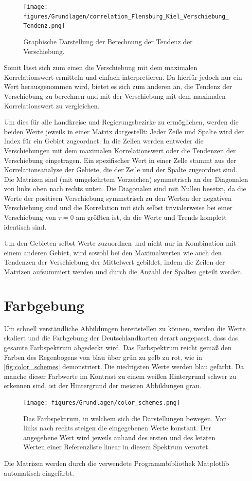 \begin{figure}[H]
    \centering
    \texttt{[image: figures/Grundlagen/correlation\_Flensburg\_Kiel\_Verschiebung\_Tendenz.png]}
    \caption{Graphische Darstellung der Berechnung der Tendenz der Verschiebung.}
    \label{fig:Flensburg_Kiel_Verschiebung_Tendenz}
\end{figure}

Somit lässt sich zum einen die Verschiebung mit dem maximalen Korrelationswert ermitteln und einfach interpretieren.
Da hierfür jedoch nur ein Wert herausgenommen wird, bietet es sich zum anderen an, die Tendenz der Verschiebung zu berechnen und mit der Verschiebung mit dem maximalen Korrelationswert zu vergleichen.



Um dies für alle Landkreise und Regierungsbezirke zu ermöglichen, werden die beiden Werte jeweils in einer Matrix dargestellt: Jeder Zeile und Spalte wird der Index für ein Gebiet zugeordnet. In die Zellen werden entweder die Verschiebungen mit dem maximalen Korrelationswert oder die Tendenzen der Verschiebung eingetragen. Ein spezifischer Wert in einer Zelle stammt aus der Korrelationsanalyse der Gebiete, die der Zeile und der Spalte zugeordnet sind.
Die Matrizen sind (mit umgekehrtem Vorzeichen) symmetrisch an der Diagonalen von links oben nach rechts unten. Die Diagonalen sind mit Nullen besetzt, da die Werte der positiven Verschiebung symmetrisch zu den Werten der negativen Verschiebung sind und die Korrelation mit sich selbst trivialerweise bei einer Verschiebung von $\tau=0$ am größten ist, da die Werte und Trends komplett identisch sind.

Um den Gebieten selbst Werte zuzuordnen und nicht nur in Kombination mit einem anderen Gebiet, wird sowohl bei den Maximalwerten wie auch den Tendenzen der Verschiebung der Mittelwert gebildet, indem die Zeilen der Matrizen aufsummiert werden und durch die Anzahl der Spalten geteilt werden.
\section{Farbgebung}\label{sec:Grundlagen:Farbgebung}
Um schnell verständliche Abbildungen bereitstellen zu können, werden die Werte skaliert und die Farbgebung der Deutschlandkarten derart angepasst, dass das gesamte Farbspektrum abgedeckt wird. Das Farbspektrum reicht gemäß den Farben des Regenbogens von blau über grün zu gelb zu rot, wie in \autoref{fig:color_schemes} demonstriert. Die niedrigsten Werte werden blau gefärbt.
Da manche dieser Farbwerte im Kontrast zu einem weißen Hintergrund schwer zu erkennen sind, ist der Hintergrund der meisten Abbildungen grau.

\begin{figure}[H]
    \centering
    \texttt{[image: figures/Grundlagen/color\_schemes.png]}
    \caption{Das Farbspektrum, in welchem sich die Darstellungen bewegen. Von links nach rechts steigen die eingegebenen Werte konstant. Der angegebene Wert wird jeweils anhand des ersten und des letzten Werten einer Referenzliste linear in diesem Spektrum verortet.}
    \label{fig:color_schemes}
\end{figure}

Die Matrizen werden durch die verwendete Programmbibliothek \glqq{}Matplotlib\grqq{} automatisch eingefärbt.